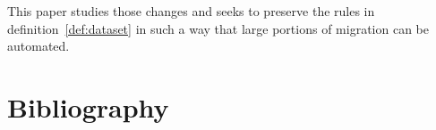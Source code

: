 \documentclass{elsarticle}
\begin{document}
   This paper studies those changes and seeks to preserve the rules in definition~\ref{def:dataset}
   in such a way that large portions of migration can be automated.


\section{Bibliography}


\end{document}
